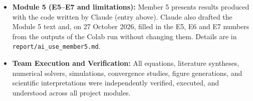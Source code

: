\documentclass[11pt,a4paper]{article}
\begin{document}
\begin{itemize}
    \item \textbf{Module 5 (E5--E7 and limitations):} Member 5 presents results produced with the code written by Claude (entry above). Claude also drafted the Module 5 text and, on 27 October 2026, filled in the E5, E6 and E7 numbers from the outputs of the Colab run without changing them. Details are in \texttt{report/ai\_use\_member5.md}.
    \item \textbf{Team Execution and Verification:} All equations, literature syntheses, numerical solvers, simulations, convergence studies, figure generations, and scientific interpretations were independently verified, executed, and understood across all project modules.
\end{itemize}



\end{document}
